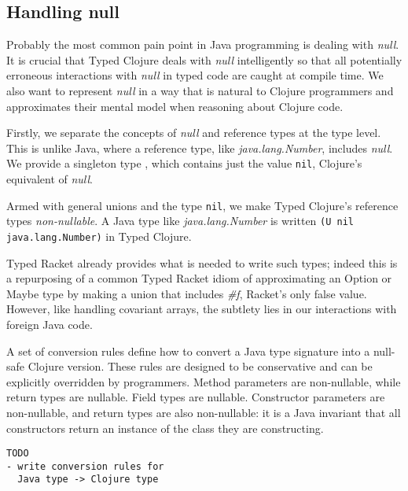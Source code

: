 \documentclass[preprint,10pt]{sigplanconf}
\begin{document}
\subsection{Handling null}
\label{sec:null}

Probably the most common pain point in Java programming is dealing with \emph{null}.
It is crucial that Typed Clojure deals with \emph{null} intelligently so that
all potentially erroneous interactions with \emph{null} in typed code are caught at compile time.
We also want to represent \emph{null} in a way that is natural to Clojure programmers
and approximates their mental model when reasoning about Clojure code.

Firstly, we separate the concepts of \emph{null} and reference types at the type level.
This is unlike Java, where a reference type, like \emph{java.lang.Number}, includes \emph{null}.
We provide a singleton type \Nil{}, which contains just the value \lstinline|nil|,
Clojure's equivalent of \emph{null}. 

Armed with general unions and the type \lstinline|nil|, 
we make Typed Clojure's reference types \emph{non-nullable}.
A Java type like \emph{java.lang.Number} is written \lstinline|(U nil java.lang.Number)|
in Typed Clojure.

Typed Racket already provides what is needed to write such types; indeed this is a repurposing
of a common Typed Racket idiom of approximating an Option or Maybe type by
making a union that includes \emph{\#f}, Racket's only false value.
However, like handling covariant arrays, the subtlety lies in our interactions with foreign
Java code.

A set of conversion rules define how to convert a Java type signature into a null-safe
Clojure version. These rules are designed to be conservative and can be explicitly overridden
by programmers. Method parameters are non-nullable, while return types are nullable.
Field types are nullable. Constructor parameters are non-nullable, and return types
are also non-nullable: it is a Java invariant that all constructors return an instance
of the class they are constructing.

\begin{verbatim}
TODO 
- write conversion rules for 
  Java type -> Clojure type
\end{verbatim}

%

%







%
%
\end{document}
